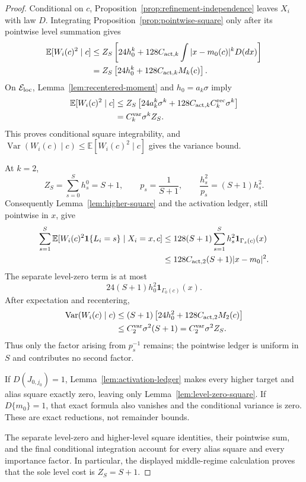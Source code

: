 \begin{proof}
Conditional on $c$, Proposition~\ref{prop:refinement-independence} leaves
$X_i$ with law $D$.  Integrating Proposition~\ref{prop:pointwise-square}
only after its pointwise level summation gives
\[
\begin{aligned}
 \mathbb E[W_i(c)^2\mid c]
 &\leq Z_S\left[24h_0^k+128C_{{\rm act},k}
   \int|x-m_0(c)|^kD(dx)\right]\\
 &=Z_S\left[24h_0^k+128C_{{\rm act},k}M_k(c)\right].
\end{aligned}
\]
On $\mathcal E_{\rm loc}$, Lemma~\ref{lem:recentered-moment} and
$h_0=a_k\sigma$ imply
\[
\begin{aligned}
 \mathbb E[W_i(c)^2\mid c]
 &\leq Z_S\left[24a_k^k\sigma^k
 +128C_{{\rm act},k}C_k^{\rm rec}\sigma^k\right]\\
 &=C_k^{\rm var}\sigma^kZ_S.
\end{aligned}
\]
This proves conditional square integrability, and
$\operatorname{Var}(W_i(c)\mid c)\leq\mathbb E[W_i(c)^2\mid c]$ gives the
variance bound.

At $k=2$,
\[
 Z_S=\sum_{s=0}^S h_s^0=S+1,
 \qquad p_s=\frac1{S+1},
 \qquad \frac{h_s^2}{p_s}=(S+1)h_s^2.
\]
Consequently Lemma~\ref{lem:higher-square} and the activation ledger, still
pointwise in $x$, give
\[
\begin{aligned}
 \sum_{s=1}^S\mathbb E[W_i(c)^2\mathbf1\{L_i=s\}\mid X_i=x,c]
 &\leq128(S+1)\sum_{s=1}^S h_s^2
   \mathbf1_{\Gamma_s(c)}(x)\\
 &\leq128C_{{\rm act},2}(S+1)|x-m_0|^2.
\end{aligned}
\]
The separate level-zero term is at most
\[
 24(S+1)h_0^2\mathbf1_{\Gamma_0(c)}(x).
\]
After expectation and recentering,
\[
\begin{aligned}
 \operatorname{Var}(W_i(c)\mid c)
 &\leq(S+1)\left[24h_0^2+128C_{{\rm act},2}M_2(c)\right]\\
 &\leq C_2^{\rm var}\sigma^2(S+1)
 =C_2^{\rm var}\sigma^2Z_S.
\end{aligned}
\]
Thus only the factor arising from $p_s^{-1}$ remains; the pointwise ledger
is uniform in $S$ and contributes no second factor.

If $D(J_{0,j_0})=1$, Lemma~\ref{lem:activation-ledger} makes every higher
target and alias square exactly zero, leaving only
Lemma~\ref{lem:level-zero-square}.  If $D\{m_0\}=1$, that exact formula
also vanishes and the conditional variance is zero.  These are exact
reductions, not remainder bounds.

The separate level-zero and higher-level square identities, their pointwise
sum, and the final conditional integration account for every alias square
and every importance factor.  In particular, the displayed middle-regime
calculation proves that the sole level cost is $Z_S=S+1$.
\end{proof}

